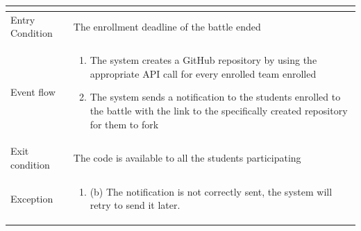 \begin{enumerate}[label=\textbf{[UC\arabic*]}]
\begin{tabular}{|l|p{11cm}|}
\begin{itemize}
                \end{itemize} \\
        \hline
        Entry Condition & The enrollment deadline of the battle ended\\
        \hline
        Event flow & \begin{enumerate}
            \item The system creates a GitHub repository by using the appropriate API call for every enrolled team enrolled
            \item The system sends a notification to the students enrolled to the battle with the link to the specifically created repository for them to fork
        \end{enumerate}\\
        \hline
        Exit condition &   The code is available to all the students participating\\
        \hline
        Exception & \begin{enumerate} [label={}, leftmargin=0.25cm ]
            \item (b) The notification is not correctly sent, the system will retry to send it later.
        \end{enumerate}\\ 
        \hline            
    \end{tabular}


\end{enumerate}
